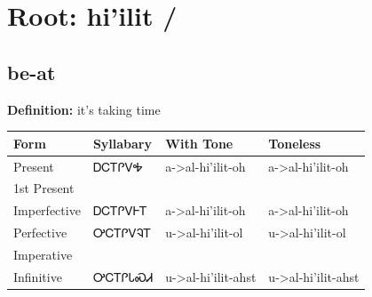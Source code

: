 \documentclass{article}%
\begin{document}
%
\normalsize%
\section*{Root: hi'ilit / }%
\subsection*{be-at}%
\textbf{Definition: }%
it’s taking time%
\\[0.5em]%
\begin{tabular}{|l|l|l|l|}%
\hline%
\textbf{Form}&\textbf{Syllabary}&\textbf{With Tone}&\textbf{Toneless}\\%
\hline%
Present&ᎠᏟᎢᎵᏙᎭ&a{-}>al{-}hi'ilit{-}oh&a{-}>al{-}hi'ilit{-}oh\\%
1st Present&&&\\%
Imperfective&ᎠᏟᎢᎵᏙᎰᎢ&a{-}>al{-}hi'ilit{-}oh&a{-}>al{-}hi'ilit{-}oh\\%
Perfective&ᎤᏟᎢᎵᏙᎸᎢ&u{-}>al{-}hi'ilit{-}ol&u{-}>al{-}hi'ilit{-}ol\\%
Imperative&&&\\%
Infinitive&ᎤᏟᎢᎵᏓᏍᏗ&u{-}>al{-}hi'ilit{-}ahst&u{-}>al{-}hi'ilit{-}ahst\\%
\hline%
\end{tabular}%
\\[1em]%
\end{document}

